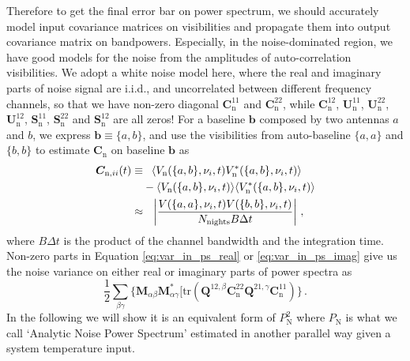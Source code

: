 \documentclass[12pt,a4paper]{article}
\begin{document}
Therefore to get the final error bar on power spectrum, we should accurately model input covariance matrices on visibilities and propagate them into output covariance matrix on bandpowers. Especially, in the noise-dominated region, we have good models for the noise from the amplitudes of auto-correlation visibilities. We adopt a white noise model here, where the real and imaginary parts of noise signal are i.i.d., and uncorrelated between different frequency channels, so that we have non-zero diagonal $\bm{C}_\text{n}^{11}$ and $\bm{C}_\text{n}^{22}$, while $\bm{C}_\text{n}^{12}$, $\bm{U}_\text{n}^{11}$, $\bm{U}_\text{n}^{22}$, $\bm{U}_\text{n}^{12}$, $\bm{S}_\text{n}^{11}$, $\bm{S}_\text{n}^{22}$ and $\bm{S}_\text{n}^{12}$ are all zeros! For a baseline $\bm{b}$ composed by two antennas $a$ and $b$, we express $\bm{b} \equiv \{a,b\}$, and use the visibilities from auto-baseline $\{a,a\}$ and $\{b,b\}$ to estimate $\bm{C}_\text{n}$ on baseline $\bm{b}$ as \citep{2015ApJ...801...51J}
\begin{align}
\label{eq:auto_vis_noise}
   \bm{C}_{\text{n},ii}(t) \equiv & \phantom{-} \langle V_\text{n}(\{a,b\},\nu_i,t) V_\text{n}^*(\{a,b\},\nu_i,t) \rangle \notag \\
   & - \langle V_\text{n}(\{a,b\},\nu_i,t) \rangle \langle V_\text{n}^*(\{a,b\},\nu_i,t) \rangle \notag \\
   \approx &  \phantom{-} \left|\frac{V(\{a,a\}, \nu_i,t)V(\{b,b\}, \nu_i,t)}{N_\text{nights} B \Delta t}\right| \,,
\end{align}
where $B\Delta t$ is the product of the channel bandwidth and the integration time. Non-zero parts in Equation \ref{eq:var_in_ps_real} or \ref{eq:var_in_ps_imag} give us the noise variance on either real or imaginary parts of power spectra as
\begin{equation}
\label{eq:analytic_noise_variance}
\frac{1}{2} \sum_{\beta\gamma}
    \Big\{\bm{M}_{\alpha\beta} \bm{M}_{\alpha\gamma}^* \big[\text{tr}(\bm{Q}^{12,\beta} \bm{C}_\text{n}^{22} \bm{Q}^{21,\gamma} \bm{C}_\text{n}^{11}) \Big\}\,.
\end{equation}
In the following we will show it is an equivalent form of $P_\text{N}^2$ where $P_\text{N}$ is what we call `Analytic Noise Power Spectrum' estimated in another parallel way given a system temperature input.
\end{document}
